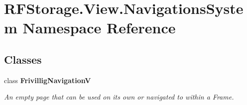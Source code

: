 \section{R\+F\+Storage.\+View.\+Navigations\+System Namespace Reference}
\label{namespace_r_f_storage_1_1_view_1_1_navigations_system}
\subsection*{Classes}
\begin{DoxyCompactItemize}
\item 
class \textbf{ Frivillig\+NavigationV}
\begin{DoxyCompactList}\small\item\em An empty page that can be used on its own or navigated to within a Frame. \end{DoxyCompactList}\end{DoxyCompactItemize}
